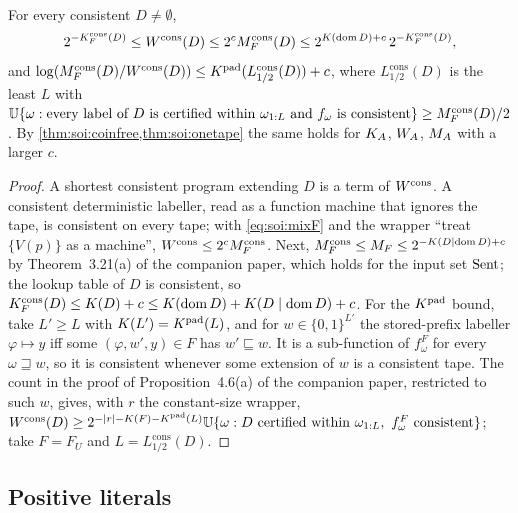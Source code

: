 \begin{proposition}\label{prop:soi:chain}
For every consistent $D\ne\emptyset$,
\[
2^{-K_{F}^{\mathrm{cons}}(D)}\le W^{\mathrm{cons}}(D)\le2^cM_{F}^{\mathrm{cons}}(D)\le2^{K(\operatorname{dom} D)+c}\,2^{-K_{F}^{\mathrm{cons}}(D)},
\]
and $\log(M_{F}^{\mathrm{cons}}(D)/W^{\mathrm{cons}}(D))\le K^{\mathrm{pad}}(L^{\mathrm{cons}}_{1/2}(D))+c$, where $L^{\mathrm{cons}}_{1/2}(D)$ is the least $L$ with $\mathbb{U}\{\omega:\text{every label of }D\text{ is certified within }\omega_{1:L}\text{ and }f_\omega\text{ is consistent}\}\ge M_{F}^{\mathrm{cons}}(D)/2$. By \cref{thm:soi:coinfree,thm:soi:onetape} the same holds for $K_{A}$, $W_{A}$, $M_{A}$ with a larger $c$.
\end{proposition}

\begin{proof}
A shortest consistent program extending $D$ is a term of $W^{\mathrm{cons}}$. A consistent deterministic labeller, read as a function machine that ignores the tape, is consistent on every tape; with \eqref{eq:soi:mixF} and the wrapper ``treat $\{V(p)\}$ as a machine'', $W^{\mathrm{cons}}\le2^cM_{F}^{\mathrm{cons}}$. Next, $M_{F}^{\mathrm{cons}}\le M_{F}\le2^{-K(D\mid\operatorname{dom} D)+c}$ by Theorem~3.21(a) of the companion paper, which holds for the input set $\mathrm{Sent}$; the lookup table of $D$ is consistent, so $K_{F}^{\mathrm{cons}}(D)\le K(D)+c\le K(\operatorname{dom} D)+K(D\mid\operatorname{dom} D)+c$. For the $K^{\mathrm{pad}}$ bound, take $L'\ge L$ with $K(L')=K^{\mathrm{pad}}(L)$, and for $w\in\{0,1\}^{L'}$ the stored-prefix labeller $\varphi\mapsto y$ iff some $(\varphi,w',y)\in F$ has $w'\sqsubseteq w$. It is a sub-function of $f^F_\omega$ for every $\omega\sqsupseteq w$, so it is consistent whenever some extension of $w$ is a consistent tape. The count in the proof of Proposition~4.6(a) of the companion paper, restricted to such $w$, gives, with $r$ the constant-size wrapper, $W^{\mathrm{cons}}(D)\ge2^{-\lvert r\rvert-K(F)-K^{\mathrm{pad}}(L)}\mathbb{U}\{\omega:D\text{ certified within }\omega_{1:L},\ f^F_\omega\text{ consistent}\}$; take $F=F_U$ and $L=L^{\mathrm{cons}}_{1/2}(D)$.
\end{proof}

\subsection{Positive literals}\label{sec:app:soi:literals}

